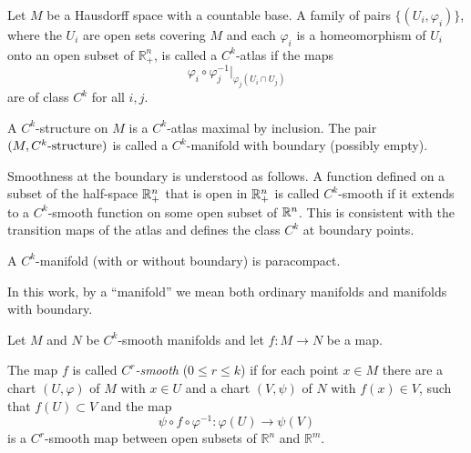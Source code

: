 \begin{define}
    Let $M$ be a Hausdorff space with a countable base.
    A family of pairs $\{(U_i,\varphi_i)\}$, where the $U_i$ are open sets
    covering $M$ and each $\varphi_i$ is a homeomorphism of $U_i$ onto an open
    subset of $\mathbb{R}^n_+$, is called a $C^k$-atlas if
    the maps
    $$
    \varphi_i \circ \varphi_j^{-1} \bigl|_{\varphi_j(U_i \cap U_j)}
    $$
    are of class $C^k$ for all $i,j$.

    A $C^k$-structure on $M$ is a $C^k$-atlas maximal by inclusion.
    The pair $(M, C^k\textup{-structure})$ is called a $C^k$-manifold
    with boundary (possibly empty).
\end{define}
\begin{comm}
  Smoothness at the boundary is understood as follows. A function defined on a subset of the half-space $\mathbb R^n_+$ that is open in $\mathbb R^n_+$ is called $C^k$-smooth if it extends to a $C^k$-smooth function on some open subset of $\mathbb R^n$. This is consistent with the transition maps of the atlas and defines the class $C^k$ at boundary points.
\end{comm}
\begin{comm}\label{comm: paracompact}
A $C^k$-manifold (with or without boundary) is paracompact.
\end{comm}
\begin{comm}
  In this work, by a ``manifold'' we mean both ordinary manifolds and manifolds with boundary.
\end{comm}
\begin{define}
    Let $M$ and $N$ be $C^k$-smooth manifolds and let
    $f : M \to N$ be a map.

    The map $f$ is called \emph{$C^r$-smooth} ($0 \le r \le k$) if
    for each point $x \in M$ there are a chart $(U, \varphi)$ of $M$
    with $x \in U$ and a chart $(V, \psi)$ of $N$ with $f(x) \in V$, such that
    $f(U) \subset V$ and the map
    $$
    \psi \circ f \circ \varphi^{-1} :
    \varphi(U) \to \psi(V)
    $$
    is a $C^r$-smooth map between open subsets of
    $\mathbb{R}^n$ and $\mathbb{R}^m$.
\end{define}

